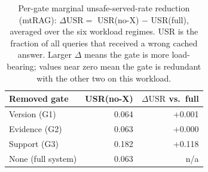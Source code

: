 \begin{table}[t]
\centering\small
\caption{Per-gate marginal unsafe-served-rate reduction (mtRAG): $\Delta\mathrm{USR}=$ USR(no-X) $-$ USR(full), averaged over the six workload regimes. USR is the fraction of all queries that received a wrong cached answer. Larger $\Delta$ means the gate is more load-bearing; values near zero mean the gate is redundant with the other two on this workload.}
\label{tab:marginal_fh}
\begin{tabular}{l rr}
\toprule
Removed gate & USR(no-X) & $\Delta\mathrm{USR}$ vs.\ full \\
\midrule
Version (G1) & 0.064 & +0.001 \\
Evidence (G2) & 0.063 & +0.000 \\
Support (G3) & 0.182 & +0.118 \\
\midrule
None (full system) & 0.063 & n/a \\
\bottomrule
\end{tabular}
\end{table}
